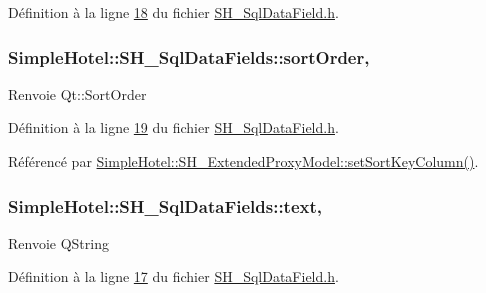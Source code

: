 Définition à la ligne \hyperlink{SH__SqlDataField_8h_source_l00018}{18} du fichier \hyperlink{SH__SqlDataField_8h_source}{S\-H\-\_\-\-Sql\-Data\-Field.\-h}.

\hypertarget{classSimpleHotel_1_1SH__SqlDataFields_ae80c421b82b4a6f242989788f2b6d299}{
\subsubsection[{sort\-Order}]{\setlength{\rightskip}{0pt plus 5cm}Simple\-Hotel\-::\-S\-H\-\_\-\-Sql\-Data\-Fields\-::sort\-Order\hspace{0.3cm}{\ttfamily [read]}, {\ttfamily [write]}}}\label{classSimpleHotel_1_1SH__SqlDataFields_ae80c421b82b4a6f242989788f2b6d299}
\begin{DoxyReturn}{Renvoie}
Qt\-::\-Sort\-Order 
\end{DoxyReturn}


Définition à la ligne \hyperlink{SH__SqlDataField_8h_source_l00019}{19} du fichier \hyperlink{SH__SqlDataField_8h_source}{S\-H\-\_\-\-Sql\-Data\-Field.\-h}.



Référencé par \hyperlink{classSimpleHotel_1_1SH__ExtendedProxyModel_a901f2d931216126e6769482d91f02fa0}{Simple\-Hotel\-::\-S\-H\-\_\-\-Extended\-Proxy\-Model\-::set\-Sort\-Key\-Column()}.

\hypertarget{classSimpleHotel_1_1SH__SqlDataFields_a40e3ac268e86d76fc20935deafd87af5}{
\subsubsection[{text}]{\setlength{\rightskip}{0pt plus 5cm}Simple\-Hotel\-::\-S\-H\-\_\-\-Sql\-Data\-Fields\-::text\hspace{0.3cm}{\ttfamily [read]}, {\ttfamily [write]}}}\label{classSimpleHotel_1_1SH__SqlDataFields_a40e3ac268e86d76fc20935deafd87af5}
\begin{DoxyReturn}{Renvoie}
Q\-String 
\end{DoxyReturn}


Définition à la ligne \hyperlink{SH__SqlDataField_8h_source_l00017}{17} du fichier \hyperlink{SH__SqlDataField_8h_source}{S\-H\-\_\-\-Sql\-Data\-Field.\-h}.



